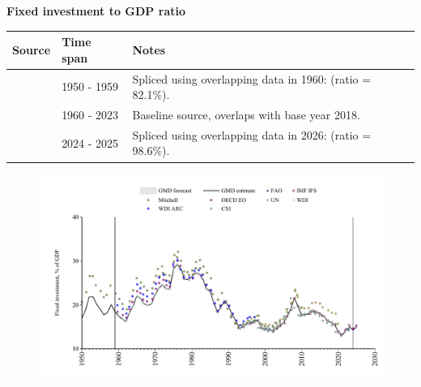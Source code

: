 \documentclass[12pt,a4paper,landscape]{article}
\begin{document}
\begin{adjustbox}{max totalsize={\paperwidth}{\paperheight},center}
\begin{minipage}[t][\textheight][t]{\textwidth}
\vspace*{0.5cm}
{}
\begin{center}
{\Large\bfseries Fixed investment to GDP ratio}
\end{center}
\vspace{0.5cm}
\begin{table}[H]
\centering
\small
\begin{tabular}{|l|l|l|}
\hline
\textbf{Source} & \textbf{Time span} & \textbf{Notes} \\
\hline
\rowcolor{white}\cite{Mitchell}& 1950 - 1959 &Spliced using overlapping data in 1960: (ratio = 82.1\%). \\
\rowcolor{lightgray}\cite{WDI}& 1960 - 2023 &Baseline source, overlaps with base year 2018. \\
\rowcolor{white}\cite{OECD_EO}& 2024 - 2025 &Spliced using overlapping data in 2026: (ratio = 98.6\%). \\
\hline
\end{tabular}
\end{table}
\begin{figure}[H]
\centering
\includegraphics[width=\textwidth,height=0.6\textheight,keepaspectratio]{graphs/ZAF_finv_GDP.pdf}
\end{figure}
\end{minipage}
\end{adjustbox}
\end{document}
